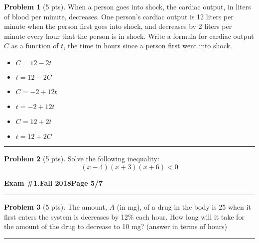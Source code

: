 \documentclass[12pt]{article}
\makeatletter
\theoremstyle{definition}
\newtheorem{problem}{Problem}
\newcommand*{\radiobutton}{%
  \@ifstar{\@radiobutton0}{\@radiobutton1}%
}
\newcommand*{\@radiobutton}[1]{%
  \begin{tikzpicture}
    \pgfmathsetlengthmacro\radius{height("X")/2}
    \draw[radius=\radius] circle;
    \ifcase#1 \fill[radius=.6*\radius] circle;\fi
  \end{tikzpicture}%
}
\makeatother
\begin{document}
\begin{problem}[5 pts]
  When a person goes into shock, the cardiac output, in liters of blood per minute, decreases. One person’s cardiac output
  is 12 liters per minute when the person first goes into shock, and decreases by 2 liters per minute every hour that the
  person is in shock. Write a formula for cardiac output $C$ as a function of $t$, the time in hours since a person first
  went into shock.
  \begin{itemize}
  \item[\radiobutton] $C = 12 - 2t$
  \item[\radiobutton] $t = 12 - 2C$
  \item[\radiobutton] $C = -2 + 12t$
  \item[\radiobutton] $t = -2 + 12t$
  \item[\radiobutton] $C = 12 + 2t$
  \item[\radiobutton] $t = 12 + 2C$
  \end{itemize}
\end{problem}
\hrule

\begin{problem}[5 pts]
  Solve the following inequality:
  \begin{equation*} (x-4)(x+3)(x+6) < 0 \end{equation*}
\end{problem}

\newpage

\hfill{\large\bf Exam \#1.}\hfill{\large\bf  Fall 2018}\hfill{\large\bf Page 5/7}\hrule

\bigskip

\begin{problem}[5 pts]
  The amount, $A$ (in mg), of a drug in the body is 25 when it first enters the system is decreases by 12\% each
  hour. How long will it take for the amount of the drug to decrease to 10 mg? (answer in terms of hours)

  \vspace{8cm}
\end{problem}

\vspace{1cm}
\hrule
\end{document}
